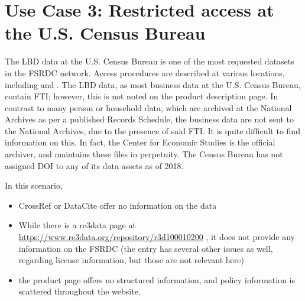 \section{Use Case 3: Restricted access at the U.S. Census Bureau}

The \ac{LBD} data \parencite{MirandaJarmin2002,LBD}  at the U.S. Census Bureau is one of the most requested datasets in the \ac{FSRDC} network. Access procedures are described at various locations, including  and . The LBD data, as most business data at the U.S. Census Bureau, contain \ac{FTI}; however, this is not noted on the product description page. In contrast to many person or household data, which are archived at the National Archives as per a published Records Schedule, the business data are not sent to the National Archives, due to the presence of said \ac{FTI}. It is quite difficult to find information on this. In fact, the Center for Economic Studies is the official archiver, and maintains these files in perpetuity. The Census Bureau has not assigned \ac{DOI} to any of its data assets as of 2018.


In this scenario, 
\begin{itemize}
	\item CrossRef or DataCite offer no information on the data
	\item While there is a re3data page at \url{https://www.re3data.org/repository/r3d100010200} \parencite{Re3data-uscb}, it does not provide any information on the \ac{FSRDC} (the entry has several other issues as well, regarding license information, but those are not relevant here)
	\item the product page offers no structured information, and policy information is scattered throughout the website.
\end{itemize}